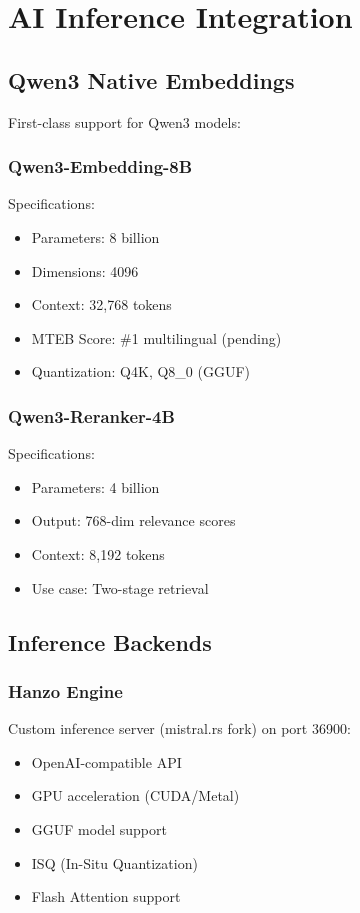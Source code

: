 \section{AI Inference Integration}


\subsection{Qwen3 Native Embeddings}

First-class support for Qwen3 models:

\subsubsection{Qwen3-Embedding-8B}

Specifications:
\begin{itemize}
\item Parameters: 8 billion
\item Dimensions: 4096
\item Context: 32,768 tokens
\item MTEB Score: \#1 multilingual (pending)
\item Quantization: Q4K, Q8\_0 (GGUF)
\end{itemize}

\subsubsection{Qwen3-Reranker-4B}

Specifications:
\begin{itemize}
\item Parameters: 4 billion
\item Output: 768-dim relevance scores
\item Context: 8,192 tokens
\item Use case: Two-stage retrieval
\end{itemize}

\subsection{Inference Backends}

\subsubsection{Hanzo Engine}

Custom inference server (mistral.rs fork) on port 36900:

\begin{itemize}
\item OpenAI-compatible API
\item GPU acceleration (CUDA/Metal)
\item GGUF model support
\item ISQ (In-Situ Quantization)
\item Flash Attention support
\end{itemize}

